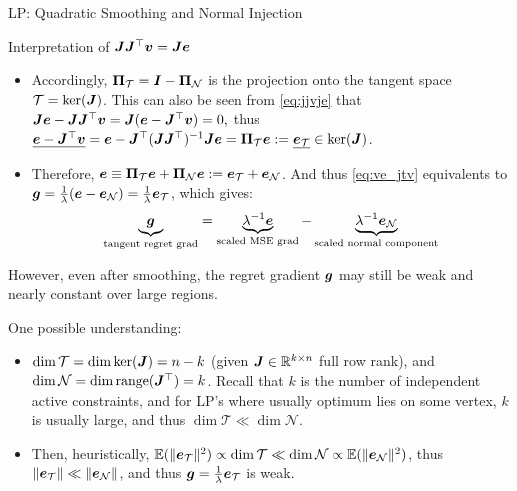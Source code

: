 \documentclass[10pt,aspectratio=169,xcolor=dvipsnames]{beamer}
\begin{document}
\begin{frame}[allowframebreaks]{LP: Quadratic Smoothing and Normal Injection}
\begin{block}{\small{Interpretation of ${\bm{J}}{\bm{J}}^\top {\bm{v}} = {\bm{J}}{\bm{e}}$}}
\begin{itemize}
        \item Accordingly, ${\bm{\Pi}}_{\mathcal{T}} = {\bm{I}} - {\bm{\Pi}}_{\mathcal{N}}$ is the projection onto the tangent space $\mathcal{T} = \ker({\bm{J}})$. This can also be seen from \eqref{eq:jjvje} that ${\bm{J}}{\bm{e}} - {\bm{J}}{\bm{J}}^\top {\bm{v}} = {\bm{J}}({\bm{e}} - {\bm{J}}^\top {\bm{v}}) = 0,$
        thus $\underline{{\bm{e}} - {\bm{J}}^\top {\bm{v}}} = {\bm{e}} - {\bm{J}}^\top ({\bm{J}}{\bm{J}}^\top)^{-1}{\bm{J}}{\bm{e}} = {\bm{\Pi}}_{\mathcal{T}} {\bm{e}} := \underline{{\bm{e}}_{\mathcal{T}}} \in \ker({\bm{J}})$.
        \item Therefore, ${\bm{e}} \equiv {\bm{\Pi}}_{\mathcal{T}} {\bm{e}} + {\bm{\Pi}}_{\mathcal{N}} {\bm{e}} := {\bm{e}}_{\mathcal{T}} + {\bm{e}}_{\mathcal{N}}$. And thus \eqref{eq:ve_jtv} equivalents to ${\bm{g}} = \frac{1}{\lambda}({\bm{e}} - {\bm{e}}_{\mathcal{N}}) = \frac{1}{\lambda}{\bm{e}}_{\mathcal{T}}$, which gives:
        \begin{equation}
            \underbrace{{\bm{g}}}_{\text{tangent regret grad}} = \underbrace{\lambda^{-1} {\bm{e}}}_{\text{scaled MSE grad}}  - \underbrace{\lambda^{-1} {\bm{e}}_{\mathcal{N}}}_{\text{scaled normal component}}
        \end{equation}
    \end{itemize}


\end{block}



    \newpage

    However, even after smoothing, the regret gradient ${\bm{g}}$ may still be weak and nearly constant over large regions.
    \begin{block}{One possible understanding:}
        \begin{itemize}
            \item  $\dim{\mathcal{T}} = \dim{\ker({\bm{J}})} = n - k$ (given ${\bm{J}} \in \mathbb{R}^{k\times n}$ full row rank), and $\dim{\mathcal{N}} = \dim{\operatorname{range}({\bm{J}}^\top)} = k$. Recall that $k$ is the number of independent active constraints, and for LP's where usually optimum lies on some vertex, $k$ is usually large, and thus $\dim{\mathcal{T}} \ll \dim{\mathcal{N}}$.
            \item Then, heuristically, $\mathbb{E}(\|{\bm{e}}_{\mathcal{T}}\|^2) \propto \dim{\mathcal{T}} \ll \dim{\mathcal{N}} \propto \mathbb{E}(\|{\bm{e}}_{\mathcal{N}}\|^2)$, thus $\|{\bm{e}}_{\mathcal{T}}\| \ll \|{\bm{e}}_{\mathcal{N}}\|$, and thus ${\bm{g}} = \frac{1}{\lambda}{\bm{e}}_{\mathcal{T}}$ is weak.
        \end{itemize}

    \end{block}

    \break


\end{frame}
\end{document}
